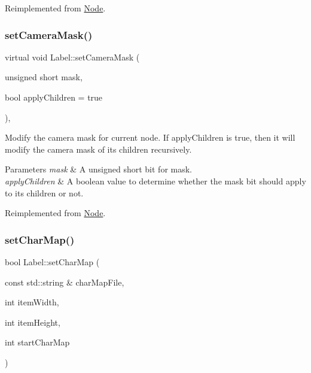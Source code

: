Reimplemented from \hyperlink{classNode_a0403546687b2cb6fc211fb461e33ba4d}{Node}.

\mbox{\label{classLabel_a8657a6d35049d6e66a79759f93890a6d}} 
\subsubsection{\texorpdfstring{set\+Camera\+Mask()}{setCameraMask()}\hspace{0.1cm}{\footnotesize\ttfamily [2/2]}}
{\footnotesize\ttfamily virtual void Label\+::set\+Camera\+Mask (\begin{DoxyParamCaption}\item[{unsigned short}]{mask,  }\item[{bool}]{apply\+Children = {\ttfamily true} }\end{DoxyParamCaption})\hspace{0.3cm}{\ttfamily [override]}, {\ttfamily [virtual]}}

Modify the camera mask for current node. If apply\+Children is true, then it will modify the camera mask of its children recursively. 
\begin{DoxyParams}{Parameters}
{\em mask} & A unsigned short bit for mask. \\
\hline
{\em apply\+Children} & A boolean value to determine whether the mask bit should apply to its children or not. \\
\hline
\end{DoxyParams}


Reimplemented from \hyperlink{classNode_a0403546687b2cb6fc211fb461e33ba4d}{Node}.

\mbox{\label{classLabel_af99a79db3a359039c5738ec76349ffa5}} 
\subsubsection{\texorpdfstring{set\+Char\+Map()}{setCharMap()}\hspace{0.1cm}{\footnotesize\ttfamily [1/6]}}
{\footnotesize\ttfamily bool Label\+::set\+Char\+Map (\begin{DoxyParamCaption}\item[{const std\+::string \&}]{char\+Map\+File,  }\item[{int}]{item\+Width,  }\item[{int}]{item\+Height,  }\item[{int}]{start\+Char\+Map }\end{DoxyParamCaption})\hspace{0.3cm}{\ttfamily [virtual]}}

